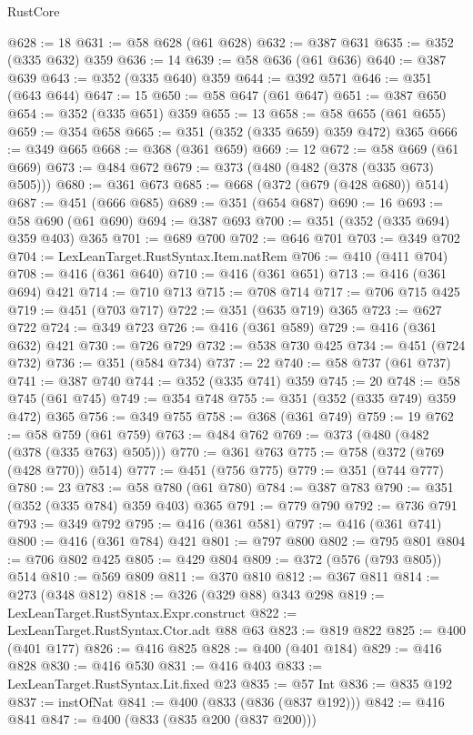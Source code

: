 \begin{lexlean}{RustCore}
\begin{coremodule}
@628 := 18
@631 := @58 @628 (@61 @628)
@632 := @387 @631
@635 := @352 (@335 @632) @359
@636 := 14
@639 := @58 @636 (@61 @636)
@640 := @387 @639
@643 := @352 (@335 @640) @359
@644 := @392 @571
@646 := @351 (@643 @644)
@647 := 15
@650 := @58 @647 (@61 @647)
@651 := @387 @650
@654 := @352 (@335 @651) @359
@655 := 13
@658 := @58 @655 (@61 @655)
@659 := @354 @658
@665 := @351 (@352 (@335 @659) @359 @472) @365
@666 := @349 @665
@668 := @368 (@361 @659)
@669 := 12
@672 := @58 @669 (@61 @669)
@673 := @484 @672
@679 := @373 (@480 (@482 (@378 (@335 @673) @505)))
@680 := @361 @673
@685 := @668 (@372 (@679 (@428 @680)) @514)
@687 := @451 (@666 @685)
@689 := @351 (@654 @687)
@690 := 16
@693 := @58 @690 (@61 @690)
@694 := @387 @693
@700 := @351 (@352 (@335 @694) @359 @403) @365
@701 := @689 @700
@702 := @646 @701
@703 := @349 @702
@704 := LexLeanTarget.RustSyntax.Item.natRem
@706 := @410 (@411 @704)
@708 := @416 (@361 @640)
@710 := @416 (@361 @651)
@713 := @416 (@361 @694) @421
@714 := @710 @713
@715 := @708 @714
@717 := @706 @715 @425
@719 := @451 (@703 @717)
@722 := @351 (@635 @719) @365
@723 := @627 @722
@724 := @349 @723
@726 := @416 (@361 @589)
@729 := @416 (@361 @632) @421
@730 := @726 @729
@732 := @538 @730 @425
@734 := @451 (@724 @732)
@736 := @351 (@584 @734)
@737 := 22
@740 := @58 @737 (@61 @737)
@741 := @387 @740
@744 := @352 (@335 @741) @359
@745 := 20
@748 := @58 @745 (@61 @745)
@749 := @354 @748
@755 := @351 (@352 (@335 @749) @359 @472) @365
@756 := @349 @755
@758 := @368 (@361 @749)
@759 := 19
@762 := @58 @759 (@61 @759)
@763 := @484 @762
@769 := @373 (@480 (@482 (@378 (@335 @763) @505)))
@770 := @361 @763
@775 := @758 (@372 (@769 (@428 @770)) @514)
@777 := @451 (@756 @775)
@779 := @351 (@744 @777)
@780 := 23
@783 := @58 @780 (@61 @780)
@784 := @387 @783
@790 := @351 (@352 (@335 @784) @359 @403) @365
@791 := @779 @790
@792 := @736 @791
@793 := @349 @792
@795 := @416 (@361 @581)
@797 := @416 (@361 @741)
@800 := @416 (@361 @784) @421
@801 := @797 @800
@802 := @795 @801
@804 := @706 @802 @425
@805 := @429 @804
@809 := @372 (@576 (@793 @805)) @514
@810 := @569 @809
@811 := @370 @810
@812 := @367 @811
@814 := @273 (@348 @812)
@818 := @326 (@329 @88) @343 @298
@819 := LexLeanTarget.RustSyntax.Expr.construct
@822 := LexLeanTarget.RustSyntax.Ctor.adt @88 @63
@823 := @819 @822
@825 := @400 (@401 @177)
@826 := @416 @825
@828 := @400 (@401 @184)
@829 := @416 @828
@830 := @416 @530
@831 := @416 @403
@833 := LexLeanTarget.RustSyntax.Lit.fixed @23
@835 := @57 Int
@836 := @835 @192
@837 := instOfNat
@841 := @400 (@833 (@836 (@837 @192)))
@842 := @416 @841
@847 := @400 (@833 (@835 @200 (@837 @200)))

\end{coremodule}
\end{lexlean}
